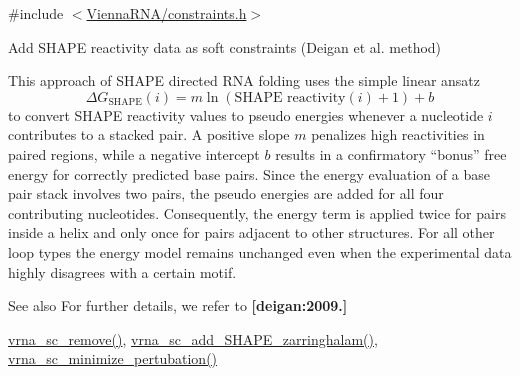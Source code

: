 {\ttfamily \#include $<$\hyperlink{constraints_8h}{Vienna\+R\+N\+A/constraints.\+h}$>$}



Add S\+H\+A\+P\+E reactivity data as soft constraints (Deigan et al. method) 

This approach of S\+H\+A\+P\+E directed R\+N\+A folding uses the simple linear ansatz \[ \Delta G_{\text{SHAPE}}(i) = m \ln(\text{SHAPE reactivity}(i)+1)+ b \] to convert S\+H\+A\+P\+E reactivity values to pseudo energies whenever a nucleotide $ i $ contributes to a stacked pair. A positive slope $ m $ penalizes high reactivities in paired regions, while a negative intercept $ b $ results in a confirmatory ``bonus'' free energy for correctly predicted base pairs. Since the energy evaluation of a base pair stack involves two pairs, the pseudo energies are added for all four contributing nucleotides. Consequently, the energy term is applied twice for pairs inside a helix and only once for pairs adjacent to other structures. For all other loop types the energy model remains unchanged even when the experimental data highly disagrees with a certain motif.

\begin{DoxySeeAlso}{See also}
For further details, we refer to {\bfseries [deigan\+:2009.]} 

\hyperlink{group__soft__constraints_ga73cdc07b9a199c614367bebef0f2c41a}{vrna\+\_\+sc\+\_\+remove()}, \hyperlink{group__soft__constraints_gaf3c65a045060aef5c4e41693d30af58c}{vrna\+\_\+sc\+\_\+add\+\_\+\+S\+H\+A\+P\+E\+\_\+zarringhalam()}, \hyperlink{group__soft__constraints_gaa124bdc20d88001c38ade590c4bcc3c4}{vrna\+\_\+sc\+\_\+minimize\+\_\+pertubation()}
\end{DoxySeeAlso}

